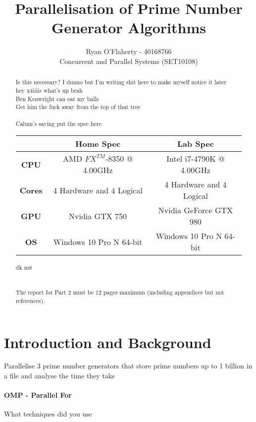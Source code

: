 \documentclass[12pt, conference]{article}
\title{Parallelisation of Prime Number Generator Algorithms}
\author{\vspace{-1.5cm}Ryan O'Flaherty - 40168766 \\ Concurrent and Parallel Systems (SET10108)}
\date{}
\begin{document}
\maketitle
\vspace{-2cm}
\begin{abstract}
Is this necessary? I dunno but I'm writing shit here to make myself notice it later \\ hey x4iiiis what's up brah \\ Ben Kenwright can eat my balls \\Get him the fuck away from the top of that tree\\\\ Calum's saying put the spec here 

\begin{table}[h]
	\begin{center}
		\begin{tabular}{|c|c|c|}
			\hline
			 & \textbf{Home Spec} & \textbf{Lab Spec}\\
			 \hline
			 \textbf{CPU} & AMD $FX^{TM}$-8350 @ 4.00GHz& Intel i7-4790K @ 4.00GHz\\
			 \hline
			 \textbf{Cores} & 4 Hardware and 4 Logical & 4 Hardware and 4 Logical\\
			 \hline
			\textbf{GPU} & Nvidia GTX 750 & Nvidia GeForce GTX 980\\
			\hline
			\textbf{OS} & Windows 10 Pro N 64-bit & Windows 10 Pro N 64-bit\\
			\hline
		\end{tabular}
	\end{center}
\end{table}

dk m8 \\\\\\The report for Part 2 must be 12 pages maximum (including appendices but not references).


\end{abstract}

\section{Introduction and Background}
Parallelise 3 prime number generators that store prime numbers up to 1 billion in a file and analyse the time they take

\paragraph{OMP - Parallel For\\}
What techniques did you use 
\end{document}
